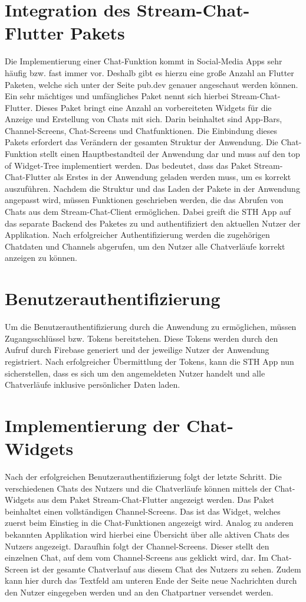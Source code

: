 \section{Integration des Stream-Chat-Flutter Pakets}
Die Implementierung einer Chat-Funktion kommt in Social-Media Apps sehr häufig bzw. fast immer vor. Deshalb gibt es hierzu eine große Anzahl an Flutter Paketen, welche sich unter der Seite pub.dev genauer angeschaut werden können. Ein sehr mächtiges und umfängliches Paket nennt sich hierbei Stream-Chat-Flutter. Dieses Paket bringt eine Anzahl an vorbereiteten Widgets für die Anzeige und Erstellung von Chats mit sich. Darin beinhaltet sind App-Bars, Channel-Screens, Chat-Screens und Chatfunktionen. Die Einbindung dieses Pakets erfordert das Verändern der gesamten Struktur der Anwendung. Die Chat-Funktion stellt einen Hauptbestandteil der Anwendung dar und muss auf den top of Widget-Tree implementiert werden. Das bedeutet, dass das Paket Stream-Chat-Flutter als Erstes in der Anwendung geladen werden muss, um es korrekt auszuführen. Nachdem die Struktur und das Laden der Pakete in der Anwendung angepasst wird, müssen Funktionen geschrieben werden, die das Abrufen von Chats aus dem Stream-Chat-Client ermöglichen. Dabei greift die STH App auf das separate Backend des Paketes zu und authentifiziert den aktuellen Nutzer der Applikation. Nach erfolgreicher Authentifizierung werden die zugehörigen Chatdaten und Channels abgerufen, um den Nutzer alle Chatverläufe korrekt anzeigen zu können.

\section{Benutzerauthentifizierung}
Um die Benutzerauthentifizierung durch die Anwendung zu ermöglichen, müssen Zugangsschlüssel bzw. Tokens bereitstehen. Diese Tokens werden durch den Aufruf durch Firebase generiert und der jeweilige Nutzer der Anwendung registriert. Nach erfolgreicher Übermittlung der Tokens, kann die STH App nun sicherstellen, dass es sich um den angemeldeten Nutzer handelt und alle Chatverläufe inklusive persönlicher Daten laden. 

\section{Implementierung der Chat-Widgets}
Nach der erfolgreichen Benutzerauthentifizierung folgt der letzte Schritt. Die verschiedenen Chats des Nutzers und die Chatverläufe können mittels der Chat-Widgets aus dem Paket Stream-Chat-Flutter angezeigt werden. Das Paket beinhaltet einen vollständigen Channel-Screens. Das ist das Widget, welches zuerst beim Einstieg in die Chat-Funktionen angezeigt wird. Analog zu anderen bekannten Applikation wird hierbei eine Übersicht über alle aktiven Chats des Nutzers angezeigt. Daraufhin folgt der Channel-Screens. Dieser stellt den einzelnen Chat, auf dem vom Channel-Screens aus geklickt wird, dar. Im Chat-Screen ist der gesamte Chatverlauf aus diesem Chat des Nutzers zu sehen. Zudem kann hier durch das Textfeld am unteren Ende der Seite neue Nachrichten durch den Nutzer eingegeben werden und an den Chatpartner versendet werden.

